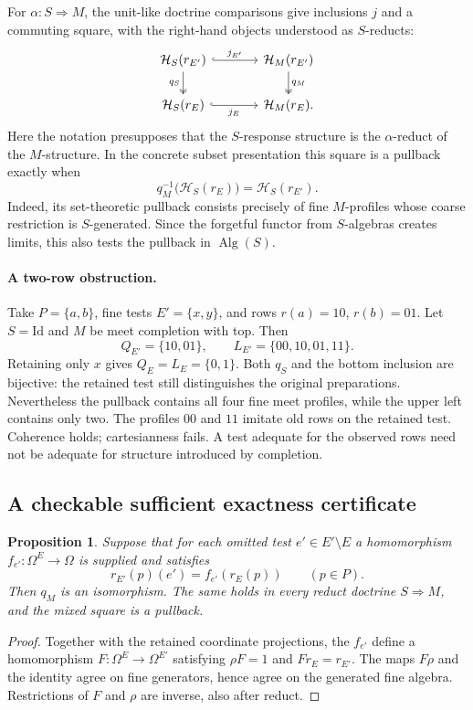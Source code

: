 \documentclass[11pt]{article}
\newtheorem{proposition}[theorem]{Proposition}
\DeclareMathOperator{\Alg}{Alg}
\newcommand{\HH}{\mathcal H}
\begin{document}
For $\alpha:S\Rightarrow M$, the unit-like doctrine comparisons give inclusions $j$ and a commuting square, with the right-hand objects understood as $S$-reducts:
\[
\begin{tikzcd}[column sep=large]
\HH_S(r_{E'}) \arrow[r,hook,"j_{E'}"] \arrow[d,two heads,"q_S"'] &
\HH_M(r_{E'}) \arrow[d,two heads,"q_M"]\\
\HH_S(r_E) \arrow[r,hook,"j_E"'] & \HH_M(r_E).
\end{tikzcd}
\]
Here the notation presupposes that the $S$-response structure is the $\alpha$-reduct of the $M$-structure. In the concrete subset presentation this square is a pullback exactly when
\begin{equation}
 q_M^{-1}\bigl(\HH_S(r_E)\bigr)=\HH_S(r_{E'}).
 \label{eq:pullback}
\end{equation}
Indeed, its set-theoretic pullback consists precisely of fine $M$-profiles whose coarse restriction is $S$-generated. Since the forgetful functor from $S$-algebras creates limits, this also tests the pullback in $\Alg(S)$.

\paragraph{A two-row obstruction.}
Take $P=\{a,b\}$, fine tests $E'=\{x,y\}$, and rows $r(a)=10$, $r(b)=01$. Let $S=\mathrm{Id}$ and $M$ be meet completion with top. Then
\[
 Q_{E'}=\{10,01\},\qquad L_{E'}=\{00,10,01,11\}.
\]
Retaining only $x$ gives $Q_E=L_E=\{0,1\}$. Both $q_S$ and the bottom inclusion are bijective: the retained test still distinguishes the original preparations. Nevertheless the pullback contains all four fine meet profiles, while the upper left contains only two. The profiles $00$ and $11$ imitate old rows on the retained test. Coherence holds; cartesianness fails. A test adequate for the observed rows need not be adequate for structure introduced by completion.

\subsection{A checkable sufficient exactness certificate}
\begin{proposition}
Suppose that for each omitted test $e'\in E'\setminus E$ a homomorphism $f_{e'}:\Omega^E\to\Omega$ is supplied and satisfies
\[
 r_{E'}(p)(e')=f_{e'}(r_E(p))\qquad(p\in P).
\]
Then $q_M$ is an isomorphism. The same holds in every reduct doctrine $S\Rightarrow M$, and the mixed square is a pullback.
\end{proposition}
\begin{proof}
Together with the retained coordinate projections, the $f_{e'}$ define a homomorphism $F:\Omega^E\to\Omega^{E'}$ satisfying $\rho F=1$ and $Fr_E=r_{E'}$. The maps $F\rho$ and the identity agree on fine generators, hence agree on the generated fine algebra. Restrictions of $F$ and $\rho$ are inverse, also after reduct.
\end{proof}
\end{document}
